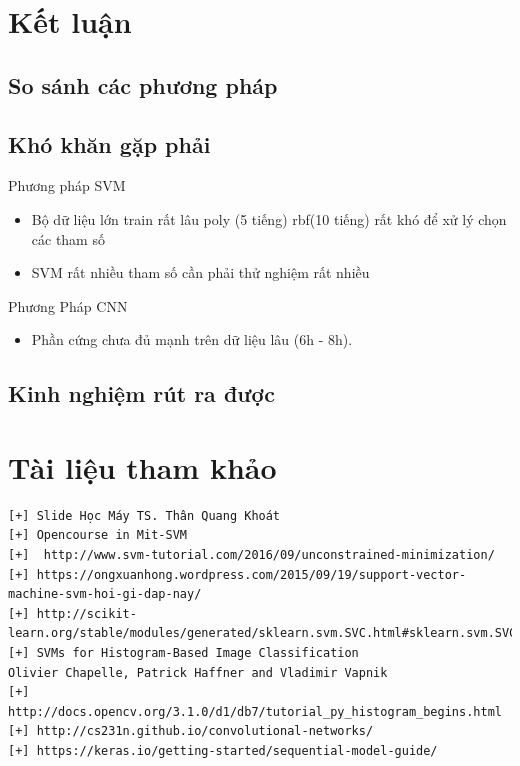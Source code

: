 \documentclass[a4paper,12pt]{report}
\begin{document}
\chapter{Kết luận}
\section{So sánh các phương pháp}
\section{Khó khăn gặp phải}
Phương pháp SVM
\begin{itemize}
\item Bộ dữ liệu lớn train rất lâu poly (5 tiếng) rbf(10 tiếng) rất khó để xử lý chọn các tham số 
\item SVM rất nhiều tham số cần phải thử nghiệm rất nhiều
\end{itemize}
Phương Pháp CNN
\begin{itemize}
\item Phần cứng chưa đủ mạnh trên dữ liệu lâu (6h - 8h).
\end{itemize}
\section{Kinh nghiệm rút ra được}
\chapter{Tài liệu tham khảo}

\begin{verbatim}
[+] Slide Học Máy TS. Thân Quang Khoát
[+] Opencourse in Mit-SVM 
[+]  http://www.svm-tutorial.com/2016/09/unconstrained-minimization/
[+] https://ongxuanhong.wordpress.com/2015/09/19/support-vector-machine-svm-hoi-gi-dap-nay/
[+] http://scikit-learn.org/stable/modules/generated/sklearn.svm.SVC.html#sklearn.svm.SVC 
[+] SVMs for Histogram-Based Image Classification
Olivier Chapelle, Patrick Haffner and Vladimir Vapnik
[+] http://docs.opencv.org/3.1.0/d1/db7/tutorial_py_histogram_begins.html
[+] http://cs231n.github.io/convolutional-networks/
[+] https://keras.io/getting-started/sequential-model-guide/

\end{verbatim}
\end{document}
